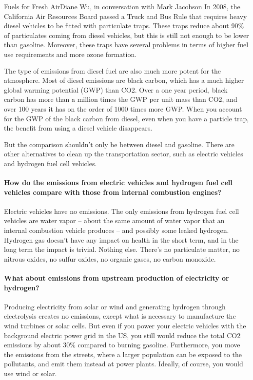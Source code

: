 \documentclass{papertex}
\begin{document}
\begin{news}{2}{Fuels for Fresh Air}{Diane Wu, in conversation with Mark Jacobson}{}{}
In 2008, the California Air Resources Board passed a Truck and Bus Rule that 
requires heavy diesel vehicles to be fitted with particulate traps. These 
traps reduce about 90\% of particulates coming from diesel vehicles, but this 
is still not enough to be lower than gasoline. Moreover, these traps have 
several problems in terms of higher fuel use requirements and more ozone 
formation.

The type of emissions from diesel fuel are also much more potent for the 
atmosphere. Most of diesel emissions are black carbon, which has a much higher 
global warming potential (GWP) than CO2. Over a one year period, black carbon 
has more than a million times the GWP per unit mass than CO2, and over 100 
years it has on the order of 1000 times more GWP. When you account for the 
GWP of the black carbon from diesel, even when you have a particle trap, the 
benefit from using a diesel vehicle disappears.

But the comparison shouldn’t only be between diesel and gasoline. There are 
other alternatives to clean up the transportation sector, such as electric 
vehicles and hydrogen fuel cell vehicles.
\\
\\
\textbf{How do the emissions from electric vehicles and hydrogen fuel cell 
    vehicles compare with those from internal combustion engines?}
\\
\\
Electric vehicles have no emissions. The only emissions from hydrogen fuel 
cell vehicles are water vapor – about the same amount of water vapor that an 
internal combustion vehicle produces – and possibly some leaked hydrogen. 
Hydrogen gas doesn’t have any impact on health in the short term, and in the 
long term the impact is trivial. Nothing else. There’s no particulate matter, 
no nitrous oxides, no sulfur oxides, no organic gases, no carbon monoxide.
\\
\\
\textbf{What about emissions from upstream production of electricity or 
    hydrogen?}
\\
\\
Producing electricity from solar or wind and generating hydrogen through 
electrolysis creates no emissions, except what is necessary to manufacture 
the wind turbines or solar cells. But even if you power your electric vehicles 
with the background electric power grid in the US, you still would reduce the 
total CO2 emissions by about 30\% compared to burning gasoline. Furthermore, 
you move the emissions from the streets, where a larger population can be 
exposed to the pollutants, and emit them instead at power plants. Ideally, of 
course, you would use wind or solar.


\end{news}
\end{document}
